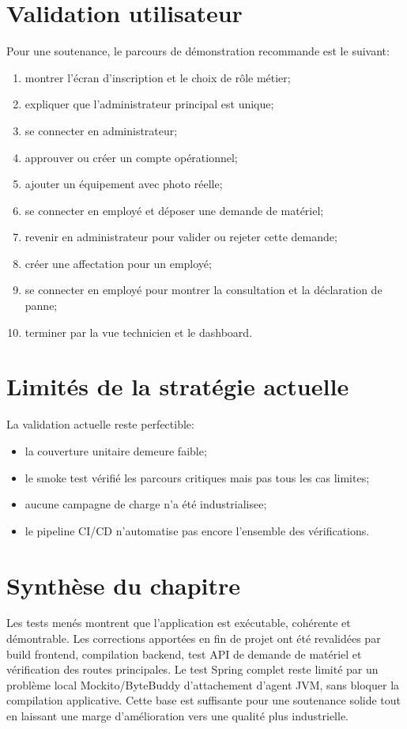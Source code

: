 ﻿\documentclass[12pt,a4paper,oneside]{report}
\begin{document}
\section{Validation utilisateur}
Pour une soutenance, le parcours de démonstration recommande est le suivant:
\begin{enumerate}
  \item montrer l'écran d'inscription et le choix de rôle métier;
  \item expliquer que l'administrateur principal est unique;
  \item se connecter en administrateur;
  \item approuver ou créer un compte opérationnel;
  \item ajouter un équipement avec photo réelle;
  \item se connecter en employé et déposer une demande de matériel;
  \item revenir en administrateur pour valider ou rejeter cette demande;
  \item créer une affectation pour un employé;
  \item se connecter en employé pour montrer la consultation et la déclaration de panne;
  \item terminer par la vue technicien et le dashboard.
\end{enumerate}

\section{Limités de la stratégie actuelle}
La validation actuelle reste perfectible:
\begin{itemize}
  \item la couverture unitaire demeure faible;
  \item le smoke test vérifié les parcours critiques mais pas tous les cas limites;
  \item aucune campagne de charge n'a été industrialisee;
  \item le pipeline CI/CD n'automatise pas encore l'ensemble des vérifications.
\end{itemize}

\section{Synthèse du chapitre}
Les tests menés montrent que l'application est exécutable, cohérente et démontrable. Les corrections apportées en fin de projet ont été revalidées par build frontend, compilation backend, test API de demande de matériel et vérification des routes principales. Le test Spring complet reste limité par un problème local Mockito/ByteBuddy d'attachement d'agent JVM, sans bloquer la compilation applicative. Cette base est suffisante pour une soutenance solide tout en laissant une marge d'amélioration vers une qualité plus industrielle.
\end{document}
